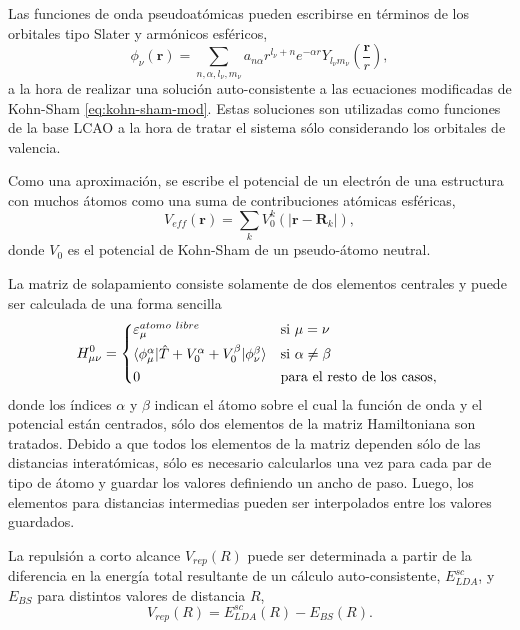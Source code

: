 \begin{enumerate}
        Las funciones de onda pseudoatómicas pueden escribirse en términos de los
        orbitales tipo Slater y armónicos esféricos,
        $$
        \phi_{\nu}(\mathbf{r}) = \sum_{n,\alpha,l_{\nu},m_{\nu}} a_{n\alpha} r^{l_{\nu}+n} e^{-\alpha r} Y_{l_{\nu}m_{\nu}}\left(\frac{\mathbf{r}}{r}\right),
        $$
        a la hora de realizar una solución auto-consistente a las ecuaciones
        modificadas de Kohn-Sham \ref{eq:kohn-sham-mod}. Estas soluciones son
        utilizadas como funciones de la base LCAO a la hora de tratar el sistema
        sólo considerando los orbitales de valencia.
        
        Como una aproximación, se escribe el potencial de un electrón de una 
        estructura con muchos átomos como una suma de contribuciones atómicas
        esféricas,
        $$
        V_{eff}(\mathbf{r}) = \sum_k V_0^k(|\mathbf{r} - \mathbf{R}_k|),
        $$
        donde $V_0$ es el potencial de Kohn-Sham de un pseudo-átomo neutral.

        La matriz de solapamiento consiste solamente de dos elementos centrales
        y puede ser calculada de una forma sencilla
        \begin{equation*}
            H_{\mu\nu}^0 = 
            \begin{cases*}
                \varepsilon_{\mu}^{atomo\ libre} & si $\mu = \nu$ \\
                \langle \phi_{\mu}^{\alpha} | \hat{T} + V_0^{\alpha} + V_0^{\beta} | \phi_{\nu}^{\beta} \rangle & si $\alpha \neq \beta$ \\
                0 & para el resto de los casos,
            \end{cases*}
        \end{equation*}
        donde los índices $\alpha$ y $\beta$ indican el átomo sobre el cual la
        función de onda y el potencial están centrados, sólo dos elementos de la 
        matriz Hamiltoniana son tratados. Debido a que todos los elementos de la 
        matriz dependen sólo de las distancias interatómicas, sólo es necesario
        calcularlos una vez para cada par de tipo de átomo y guardar los valores
        definiendo un ancho de paso. Luego, los elementos para distancias 
        intermedias pueden ser interpolados entre los valores guardados.

        La repulsión a corto alcance $V_{rep}(R)$ puede ser determinada a partir
        de la diferencia en la energía total resultante de un cálculo 
        auto-consistente, $E_{LDA}^{sc}$, y $E_{BS}$ para distintos valores de 
        distancia $R$,
        $$
        V_{rep}(R) = E_{LDA}^{sc}(R) - E_{BS}(R).
        $$


\end{enumerate}
